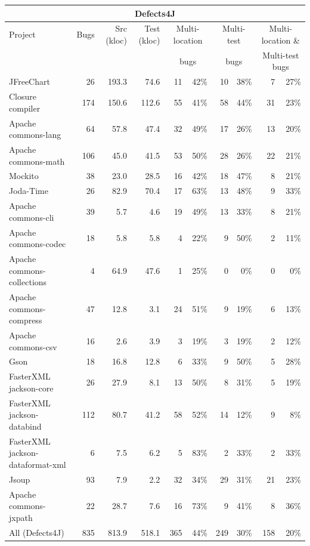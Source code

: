 \documentclass[10pt, conference]{IEEEtran}
\begin{document}
\begin{table}
\begin{center}
\begin{tabular}{l  rrr | rr | rr | rr}
\toprule
\multicolumn{10}{c}{\textbf{Defects4J}} \\
\midrule
Project & Bugs & Src (kloc) & Test (kloc) & \multicolumn{2}{c}{Multi-location} 
		& \multicolumn{2}{c}{Multi-test} & \multicolumn{2}{c}{Multi-location \&}\\
&&&&\multicolumn{2}{c}{bugs}&\multicolumn{2}{c}{bugs}&\multicolumn{2}{c}{Multi-test bugs}\\
\midrule
JFreeChart  & 26 & 193.3 & 74.6  & 11 & 42\% & 10 & 38\% & 7 & 27\%\\
Closure compiler & 174 & 150.6 & 112.6 & 55 & 41\% & 58 & 44\% & 31 & 23\%\\
Apache commons-lang & 64 & 57.8 & 47.4  & 32 & 49\% & 17 & 26\% & 13 & 20\%\\
Apache commons-math & 106 & 45.0 & 41.5 & 53 & 50\% & 28 & 26\% & 22 & 21\%\\
Mockito & 38 & 23.0 & 28.5 & 16 & 42\% & 18 & 47\% & 8 & 21\%\\
Joda-Time & 26 & 82.9 & 70.4 & 17 & 63\% & 13 & 48\% & 9 & 33\%\\
Apache commons-cli & 39 & 5.7 & 4.6 & 19 & 49\% & 13 & 33\% & 8 & 21\%\\
Apache commons-codec & 18 & 5.8 & 5.8 & 4 & 22\% & 9 & 50\% & 2 & 11\% \\
Apache commons-collections & 4 & 64.9 & 47.6 & 1 & 25\% & 0 & 0\% & 0 & 0\%\\
Apache commons-compress & 47 & 12.8 & 3.1 & 24 & 51\% & 9 & 19\% & 6 & 13\%\\ 
Apache commons-csv & 16 & 2.6 & 3.9 & 3 & 19\% & 3 & 19\% & 2 & 12\%\\
Gson & 18 & 16.8 & 12.8 & 6 & 33\% & 9 & 50\% & 5 & 28\%\\
FasterXML jackson-core & 26 & 27.9 & 8.1 & 13 & 50\% & 8 & 31\% & 5 & 19\%\\
FasterXML jackson-databind & 112 & 80.7 & 41.2 & 58 & 52\% & 14 & 12\% & 9 & 8\%\\
FasterXML jackson-dataformat-xml & 6 & 7.5 & 6.2 & 5 & 83\% & 2 & 33\% & 2 & 33\%\\
Jsoup & 93 & 7.9 & 2.2 & 32 & 34\% & 29 & 31\% & 21 & 23\%\\
Apache commons-jxpath & 22 & 28.7 & 7.6 & 16 & 73\% & 9 & 41\% & 8 & 36\%\\
\midrule
All (Defects4J) & 835 & 813.9 & 518.1 & 365 & 44\% & 249 & 30\% & 158 & 20\%\\

\end{tabular}
\end{center}
\end{table}
\end{document}
